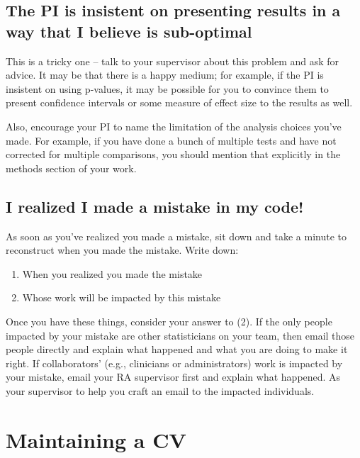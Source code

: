 \documentclass[
]{book}
\providecommand{\tightlist}{%
  \setlength{\itemsep}{0pt}\setlength{\parskip}{0pt}}
\begin{document}
\hypertarget{the-pi-is-insistent-on-presenting-results-in-a-way-that-i-believe-is-sub-optimal}{%
\subsection{The PI is insistent on presenting results in a way that I believe is sub-optimal}\label{the-pi-is-insistent-on-presenting-results-in-a-way-that-i-believe-is-sub-optimal}}

This is a tricky one -- talk to your supervisor about this problem and ask for advice. It may be that there is a happy medium; for example, if the PI is insistent on using p-values, it may be possible for you to convince them to present confidence intervals or some measure of effect size to the results as well.

Also, encourage your PI to name the limitation of the analysis choices you've made. For example, if you have done a bunch of multiple tests and have not corrected for multiple comparisons, you should mention that explicitly in the methods section of your work.

\hypertarget{i-realized-i-made-a-mistake-in-my-code}{%
\subsection{I realized I made a mistake in my code!}\label{i-realized-i-made-a-mistake-in-my-code}}

As soon as you've realized you made a mistake, sit down and take a minute to reconstruct when you made the mistake. Write down:

\begin{enumerate}
\def\labelenumi{\arabic{enumi}.}
\tightlist
\item
  When you realized you made the mistake
\item
  Whose work will be impacted by this mistake
\end{enumerate}

Once you have these things, consider your answer to (2). If the only people impacted by your mistake are other statisticians on your team, then email those people directly and explain what happened and what you are doing to make it right. If collaborators' (e.g., clinicians or administrators) work is impacted by your mistake, email your RA supervisor first and explain what happened. As your supervisor to help you craft an email to the impacted individuals.

\hypertarget{maintaining-a-cv}{%
\section{Maintaining a CV}\label{maintaining-a-cv}}
\end{document}
